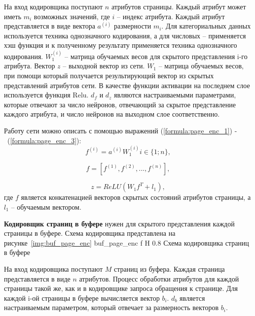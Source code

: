На вход кодировщика поступают $n$ атрибутов страницы.
Каждый атрибут может иметь $m_i$ возможных значений, где $i$ -- индекс атрибута.
Каждый атрибут представляется в виде вектора $a^{(i)}$ размерности $m_i$.
Для категориальных данных используется техника однозначного кодирования, а для числовых -- применяется хэш функция и к полученному результату применяется техника однозначного кодирования.
$W_1^{(i)}$ -- матрица обучаемых весов для скрытого представления i-го атрибута.
Вектор $z$ -- выходной вектор из сети.
$W_1$ -- матрица обучаемых весов, при помощи который получается результирующий вектор из скрытых представлений атрибутов сети.
В качестве функции активации на последнем слое используется функция Relu.
$d_f$ и $d_z$ являются настраиваемыми параметрами, которые отвечают за число нейронов, отвечающий за скрытое представление каждого атрибута, и число нейронов на выходном слое соответственно.

Работу сети можно описать с помощью выражений
(\ref{formula:page_enc_1}) -~(\ref{formula:page_enc_3}):
\begin{equation}\label{formula:page_enc_1}
	f^{(i)} = a^{(i)}W_1^{(i)} i \in \{1;n\},
\end{equation}

\begin{equation}\label{formula:page_enc_2}
	f = [f^{(1)}, f^{(2)}, ..., f^{(n)}],
\end{equation}

\begin{equation}\label{formula:page_enc_3}
	z = ReLU(W_1f^T + l_1),
\end{equation}
где $f$ является конкатенацией векторов скрытых состояний атрибутов страницы, а $l_1$ -- обучаемым вектором.

\textbf{Кодировщик страниц в буфере} нужен для скрытого представления каждой страницы в буфере.
Схема кодировщика представлена на рисунке~\ref{img:buf_page_enc}
{buf_page_enc} %
{f} %
{H} %
{0.8\textwidth} %
{Схема кодировщика страниц в буфере} %

На вход кодировщика поступают $M$ страниц из буфера.
Каждая страница представляется в виде $n$ атрибутов.
Процесс обработки атрибутов для каждой страницы такой же, как и в кодировщике запроса обращения к странице.
Для каждой i-ой страницы в буфере вычисляется вектор $b_i$.
$d_b$ является настраиваемым параметром, который отвечает за размерность векторов $b_i$.

